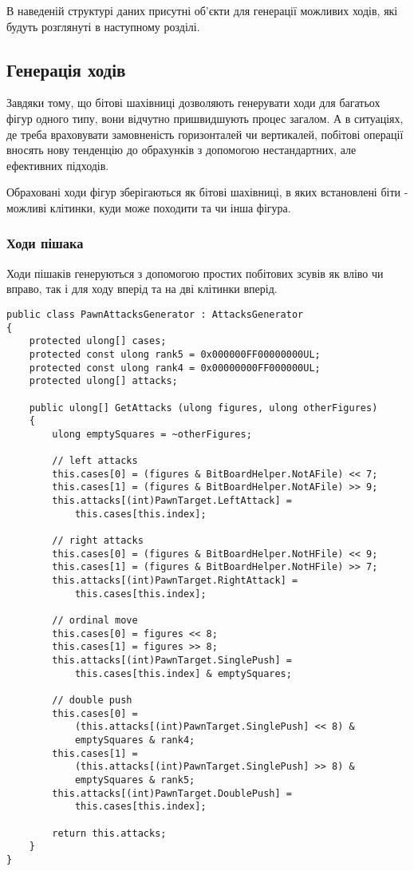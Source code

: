 \documentclass[12pt,a4paper]{article}
\begin{document}
В наведеній структурі даних присутні об'єкти для генерації можливих ходів, які
будуть розглянуті в наступному розділі.

\subsection{Генерація ходів}

Завдяки тому, що бітові шахівниці дозволяють генерувати ходи для багатьох
фігур одного типу, вони відчутно пришвидшують процес загалом. А в ситуаціях,
де треба враховувати замовненість горизонталей чи вертикалей, побітові
операції вносять нову тенденцію до обрахунків з допомогою нестандартних, але
ефективних підходів.

Обраховані ходи фігур зберігаються як бітові шахівниці, в яких встановлені
біти - можливі клітинки, куди може походити та чи інша фігура.

\subsubsection{Ходи пішака}

Ходи пішаків генеруються з допомогою простих побітових зсувів як вліво чи
вправо, так і для ходу вперід та на дві клітинки вперід.

\singlespacing
\begin{lstlisting}
public class PawnAttacksGenerator : AttacksGenerator
{
    protected ulong[] cases;
    protected const ulong rank5 = 0x000000FF00000000UL;
    protected const ulong rank4 = 0x00000000FF000000UL;
    protected ulong[] attacks;

    public ulong[] GetAttacks (ulong figures, ulong otherFigures)
    {
        ulong emptySquares = ~otherFigures;

        // left attacks
        this.cases[0] = (figures & BitBoardHelper.NotAFile) << 7;
        this.cases[1] = (figures & BitBoardHelper.NotAFile) >> 9;
        this.attacks[(int)PawnTarget.LeftAttack] =
            this.cases[this.index];

        // right attacks
        this.cases[0] = (figures & BitBoardHelper.NotHFile) << 9;
        this.cases[1] = (figures & BitBoardHelper.NotHFile) >> 7;
        this.attacks[(int)PawnTarget.RightAttack] =
            this.cases[this.index];

        // ordinal move
        this.cases[0] = figures << 8;
        this.cases[1] = figures >> 8;
        this.attacks[(int)PawnTarget.SinglePush] =
            this.cases[this.index] & emptySquares;

        // double push
        this.cases[0] =
            (this.attacks[(int)PawnTarget.SinglePush] << 8) &
            emptySquares & rank4;
        this.cases[1] =
            (this.attacks[(int)PawnTarget.SinglePush] >> 8) &
            emptySquares & rank5;
        this.attacks[(int)PawnTarget.DoublePush] =
            this.cases[this.index];

        return this.attacks;
    }
}
\end{lstlisting}
\end{document}
